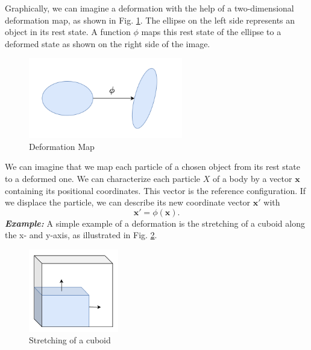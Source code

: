 Graphically, we can imagine a deformation with the help of a two-dimensional deformation map, as shown in Fig. \ref{fig:deformationmap}. The ellipse on the left side represents an object in its rest state. A function $\phi$ maps this rest state of the ellipse to a deformed state as shown on the right side of the image.
\begin{figure}[!htbp]
	\centering
	\includegraphics[width=0.6\textwidth]{resources/deformation_map_plain.png}
	\caption[Deformation Map]{Deformation Map}
	\label{fig:deformationmap}
\end{figure}

We can imagine that we map each particle of a chosen object from its rest state to a deformed one. We can characterize each particle $X$ of a body by a vector $\mathbf{x}$ containing its positional coordinates. This vector is the reference configuration. If we displace the particle, we can describe its new coordinate vector $\mathbf{x}'$ with 
\[
	\mathbf{x}' = \phi (\mathbf{x}).
\]
\textbf{\textit{Example:}} A simple example of a deformation is the stretching of a cuboid along the x- and y-axis, as illustrated in Fig. \ref{stretch:1}. 
\begin{figure}[!htbp]
	\centering
	\includegraphics[width=0.35\textwidth]{resources/stretch_plot_new.png}
	\caption[Stretching of a cuboid]{Stretching of a cuboid}
	\label{stretch:1}
\end{figure}

